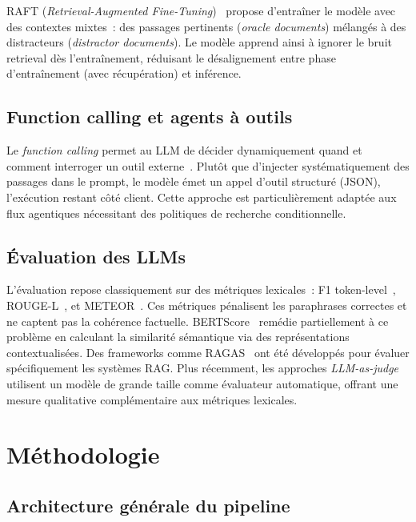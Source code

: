 \documentclass[10pt,journal,compsoc]{IEEEtran}
\begin{document}
RAFT (\textit{Retrieval-Augmented Fine-Tuning})~\cite{hong2024raft}
propose d'entraîner le modèle avec des contextes mixtes~: des passages
pertinents (\textit{oracle documents}) mélangés à des distracteurs
(\textit{distractor documents}). Le modèle apprend ainsi à ignorer
le bruit retrieval dès l'entraînement, réduisant le désalignement
entre phase d'entraînement (avec récupération) et inférence.

\subsection{Function calling et agents à outils}

Le \textit{function calling} permet au LLM de décider dynamiquement
quand et comment interroger un outil externe~\cite{schick2023toolformer}.
Plutôt que d'injecter systématiquement des passages dans le prompt, le
modèle émet un appel d'outil structuré (JSON), l'exécution restant côté
client. Cette approche est particulièrement adaptée aux flux agentiques
nécessitant des politiques de recherche conditionnelle.

\subsection{Évaluation des LLMs}

L'évaluation repose classiquement sur des métriques lexicales~:
F1 token-level~\cite{rajpurkar2016squad}, ROUGE-L~\cite{lin2004rouge},
et METEOR~\cite{banerjee2005meteor}. Ces métriques pénalisent les
paraphrases correctes et ne captent pas la cohérence factuelle.
BERTScore~\cite{zhang2020bertscore} remédie partiellement à ce problème
en calculant la similarité sémantique via des représentations
contextualisées. Des frameworks comme RAGAS~\cite{es2024ragas} ont
été développés pour évaluer spécifiquement les systèmes RAG. Plus
récemment, les approches \textit{LLM-as-judge} utilisent un modèle
de grande taille comme évaluateur automatique, offrant une mesure
qualitative complémentaire aux métriques lexicales.


\section{Méthodologie}
\label{sec:methodo}

\subsection{Architecture générale du pipeline}
\end{document}
